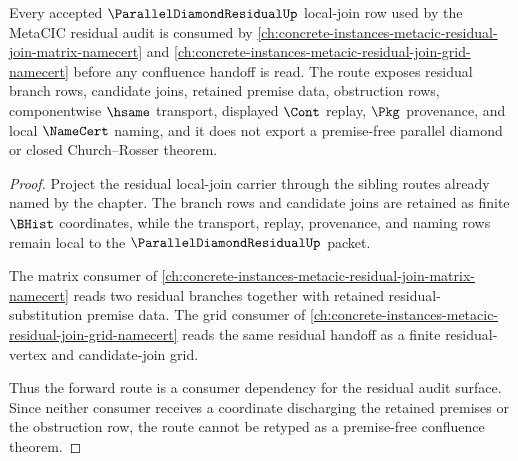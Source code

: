 \begin{theorem}
\label{thm:parallel-diamond-residual-join-matrix-forward-route}
Every accepted $\ParallelDiamondResidualUp$ local-join row used by the MetaCIC residual audit is consumed by \autoref{ch:concrete-instances-metacic-residual-join-matrix-namecert} and \autoref{ch:concrete-instances-metacic-residual-join-grid-namecert} before any confluence handoff is read. The route exposes residual branch rows, candidate joins, retained premise data, obstruction rows, componentwise $\hsame$ transport, displayed $\Cont$ replay, $\Pkg$ provenance, and local $\NameCert$ naming, and it does not export a premise-free parallel diamond or closed Church--Rosser theorem.
\end{theorem}
\begin{proof}
Project the residual local-join carrier through the sibling routes already named by the chapter. The branch rows and candidate joins are retained as finite $\BHist$ coordinates, while the transport, replay, provenance, and naming rows remain local to the $\ParallelDiamondResidualUp$ packet.

The matrix consumer of \autoref{ch:concrete-instances-metacic-residual-join-matrix-namecert} reads two residual branches together with retained residual-substitution premise data. The grid consumer of \autoref{ch:concrete-instances-metacic-residual-join-grid-namecert} reads the same residual handoff as a finite residual-vertex and candidate-join grid.

Thus the forward route is a consumer dependency for the residual audit surface. Since neither consumer receives a coordinate discharging the retained premises or the obstruction row, the route cannot be retyped as a premise-free confluence theorem.
\end{proof}

